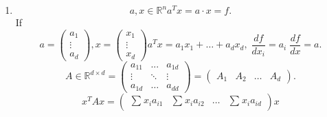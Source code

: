 \documentclass[11pt]{article}
\begin{document}
{\begin{enumerate}
\begin{enumerate}
\[        .\] 
        for $\lambda = 1$
        and
        \[
            \begin{pmatrix} -1 & 1 \\ 1 & -1 \end{pmatrix}x = 0 \;\; x = \begin{pmatrix} a \\ a \end{pmatrix}
        .\] 
        for $\lambda = 3$
    \item clearly for every eigenvalue $\lambda_i$ of $A$ $\lambda_i^{k}$ is an eigenvalue of $A^{k}$. However the converse is not always true for 
        consider the transformation on $ \mathbb{R}^2$ by 
        \[
            A = \begin{pmatrix} 0 & -1 \\ 1 & 0 \end{pmatrix} 
        .\] 
            then $A$ has no eigenvectors or eigenvalues over $ \mathbb{R}$ but $A^2 = \begin{pmatrix} -1 & 0 \\ 0 & -1 \end{pmatrix} $ has
            eigenvectors with eigenvalue -1 of which $\sqrt{-1}$ is undefined so $-1$ is not $\lambda^2$ for some $\lambda \in \mathbb{R}$.
    \end{enumerate}
\item 
    \[
    a,x \in \mathbb{R}^{n} a^{T}x = a \cdot x = f
    .\] 
    If 
    \[
    a = \begin{pmatrix} a_1 \\ \vdots \\ a_d \end{pmatrix} , x = \begin{pmatrix} x_1 \\ \vdots \\ x_d \end{pmatrix} a^{T}x =  a_1 x_1 + \dots + a_d x_d  ,\;  \frac{df}{dx_i} = a_i \; \frac{df}{dx} = a
    .\] 
    \[
        A \in \mathbb{R}^{d \times d} = \begin{pmatrix} a_{11} & ... & a_{1d}\\ \vdots & \ddots & \vdots \\ a_{1d} & \dots & a_{dd} \end{pmatrix}  = \begin{pmatrix} A_1 & A_2 & \dots & A_d \end{pmatrix} 
    .\] 
    \[
        x^{T}Ax = \begin{pmatrix} \sum_{}^{}x_ia_{i 1} & \sum_{}^{}x_i a_{i 2}    & \dots & \sum_{}^{}x_i a_{i d} \end{pmatrix}x 
\]
\end{enumerate}}
\end{document}
